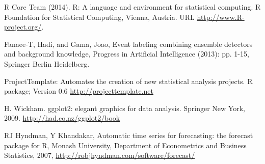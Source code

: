 \documentclass{article}
\begin{document}
\begin{thebibliography}{9}
	R Core Team (2014). R: A language and environment for statistical computing. R Foundation for Statistical Computing, Vienna, Austria.
        URL \url{http://www.R-project.org/}.


	  Fanaee-T, Hadi, and Gama, Joao, Event labeling combining ensemble detectors and background knowledge, Progress in Artificial Intelligence (2013): pp. 1-15, Springer Berlin Heidelberg.
	  
	  ProjectTemplate: Automates the creation of new statistical analysis projects. R package; Version 0.6 \url{http://projecttemplate.net}
	  
	  H. Wickham. ggplot2: elegant graphics for data analysis. Springer New York, 2009. \url{http://had.co.nz/ggplot2/book}
	  
	  RJ Hyndman, Y Khandakar, Automatic time series for forecasting: the forecast package for R, Monash University, Department of Econometrics and Business Statistics, 2007, \url{http://robjhyndman.com/software/forecast/}

\end{thebibliography}
\end{document}
